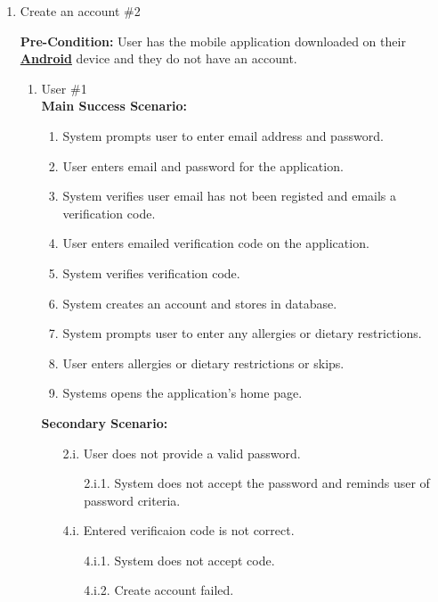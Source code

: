 \documentclass[]{article}
\begin{document}
\begin{enumerate}[{\bf BE1.}]
	\item Create an account \#2
	
	\textbf{Pre-Condition:} User has the mobile application downloaded on their \hyperref[Android]{\textbf{Android}} device and they do not have an account.
		\begin{enumerate}[{\bf VP1.}]
			\item User \#1 \\
				\textbf{Main Success Scenario:} 
				\begin{enumerate}[{1.}]
					\item System prompts user to enter email address and password.
					\item User enters email and password for the application.
					\item System verifies user email has not been registed and emails a verification code.
					\item User enters emailed verification code on the application.
					\item System verifies verification code.
					\item System creates an account and stores in database.
					\item System prompts user to enter any allergies or dietary restrictions.
					\item User enters allergies or dietary restrictions or skips.
					\item Systems opens the application's home page.
				\end{enumerate}
				\textbf{Secondary Scenario:}
				\begin{enumerate}
					\item[2.i.] User does not provide a valid password.
					\begin{enumerate}
						\item[2.i.1.] System does not accept the password and reminds user of password criteria.
					\end{enumerate}
				\end{enumerate}
				\begin{enumerate}
					\item[4.i.] Entered verificaion code is not correct.
					\begin{enumerate}
						\item[4.i.1.] System does not accept code.
						\item[4.i.2.] Create account failed.
					\end{enumerate}
				\end{enumerate}


\end{enumerate}
\end{enumerate}
\end{document}

